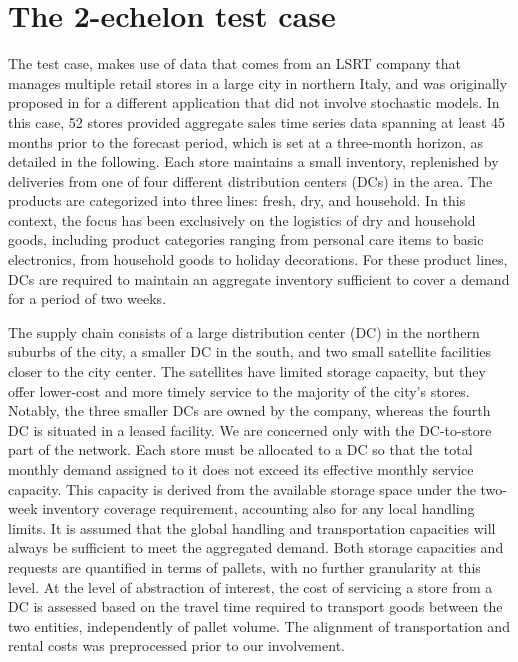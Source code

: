 \documentclass[mnsc,sglanonrev]{informs4}  %
\theoremstyle{remark}\newtheorem{remark}{Remark}
\begin{document}
\section{The 2-echelon test case} \label{Sec:testcase}

The test case, makes use of data that comes from an LSRT company that manages multiple retail stores in a large city in northern Italy, and was originally proposed in \citet{MZ23} for a different application that did not involve stochastic models. In this case, 52 stores provided aggregate sales time series data spanning at least 45 months prior to the forecast period, which is set at a three-month horizon, as detailed in the following. Each store maintains a small inventory, replenished by deliveries from one of four different distribution centers (DCs) in the area. The products are categorized into three lines: fresh, dry, and household. In this context, the focus has been exclusively on the logistics of dry and household goods, including product categories ranging from personal care items to basic electronics, from household goods to holiday decorations. For these product lines, DCs are required to maintain an aggregate inventory sufficient to cover a demand for a period of two weeks.

The supply chain consists of a large distribution center (DC) in the northern suburbs of the city, a smaller DC in the south, and two small satellite facilities closer to the city center. The satellites have limited storage capacity, but they offer lower-cost and more timely service to the majority of the city's stores.  Notably, the three smaller DCs are owned by the company, whereas the fourth DC is situated in a leased facility.
We are concerned only with the DC-to-store part of the network. Each store must be allocated to a DC so that the total monthly demand assigned to it does not exceed its effective monthly service capacity. This capacity is derived from the available storage space under the two-week inventory coverage requirement, accounting also for any local handling limits. It is assumed that the global handling and transportation capacities will always be sufficient to meet the aggregated demand. Both storage capacities and requests are quantified in terms of pallets, with no further granularity at this level. At the level of abstraction of interest, the cost of servicing a store from a DC is assessed based on the travel time required to transport goods between the two entities, independently of pallet volume. The alignment of transportation and rental costs was preprocessed prior to our involvement.
\end{document}
